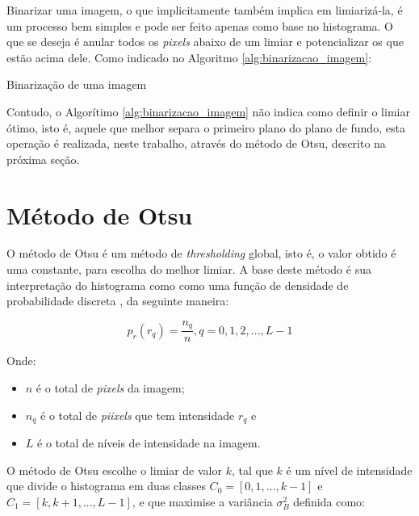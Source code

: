 Binarizar uma imagem, o que implicitamente também implica em limiarizá-la, é
um processo bem simples e pode ser feito apenas como base no histograma. O que
se deseja é anular todos os \textit{pixels} abaixo de um limiar e
potencializar os que estão acima dele. Como indicado no Algoritmo \ref{alg:binarizacao_imagem}:

\begin{algorithm}[H]
\caption{Binarização de uma imagem}\label{alg:binarizacao_imagem}
\end{algorithm}

Contudo, o Algorítimo \ref{alg:binarizacao_imagem} não indica como definir o limiar
ótimo, isto é, aquele que melhor separa o primeiro plano do plano de fundo, esta
operação é realizada, neste trabalho, através do método de Otsu, descrito na próxima seção.

\section{Método de Otsu}\label{sec:metodo_otsu}

O método de Otsu é um método de \textit{thresholding} global, isto é, o valor obtido é
uma constante, para escolha do melhor limiar. A base deste método é sua interpretação
do histograma como como uma função de densidade de probabilidade
discreta \cite{Limiar}, da seguinte maneira:

\begin{equation}\label{eq:histograma_norm}
  p_r(r_q) = \frac{n_q}{n}, q = 0, 1, 2, ..., L-1
\end{equation}

Onde:

\begin{itemize}
  \item $ n $ é o total de \textit{pixels} da imagem;
  \item $ n_q $ é o total de \textit{piixels} que tem intensidade $ r_q $ e
  \item $ L $ é o total de níveis de intensidade na imagem.
\end{itemize}

O método de Otsu escolhe o limiar de valor $ k $, tal que $ k $ é um nível de
intensidade que divide o histograma em duas classes
$ C_0 = [0, 1, ..., k-1] $ e $ C_1 = [k, k+1, ..., L-1] $, e que maximise a
variância $ \sigma_{B}^2 $ definida como:

